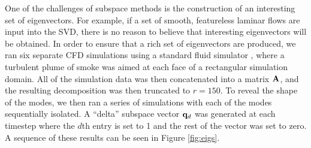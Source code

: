 \documentclass[11pt]{article}
\begin{document}
One of the challenges of subspace methods is the construction of an interesting set of eigenvectors. For example, if a set of smooth, featureless laminar flows are input into the SVD, there is no reason to believe that interesting eigenvectors will be obtained. In order to ensure that a rich set of eigenvectors are produced, we ran six separate CFD simulations using a standard fluid simulator \cite{Stam99}, where a turbulent plume of smoke was aimed at each face of a rectangular simulation domain. All of the simulation data was then concatenated into a matrix $\mathbf{A}$, and the resulting decomposition was then truncated to $r = 150$. To reveal the shape of the modes, we then ran a series of simulations with each of the modes sequentially isolated. A ``delta'' subspace vector $\mathbf{q}_d$ was generated at each timestep where the $d$th entry is set to 1 and the rest of the vector was set to zero. A sequence of these results can be seen in Figure \ref{fig:eigs}.

\end{document}
